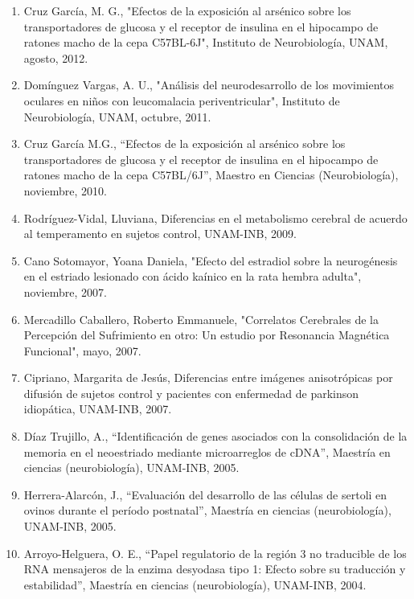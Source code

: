 \begin{enumerate}
\item Cruz García, M. G., "Efectos de la exposición al arsénico sobre los transportadores de glucosa y el receptor de insulina en el hipocampo de ratones 
macho de 
la cepa C57BL-6J", Instituto de Neurobiología, UNAM, agosto, 2012.

\item Domínguez Vargas, A. U., "Análisis del neurodesarrollo de los movimientos oculares en niños con leucomalacia periventricular", Instituto de 
Neurobiología, UNAM, octubre, 2011.

\item Cruz García M.G., “Efectos de la exposición al arsénico sobre los transportadores de glucosa y el receptor de insulina en el hipocampo de ratones 
macho de 
la cepa C57BL/6J”, Maestro en Ciencias (Neurobiología), noviembre, 2010.

\item Rodríguez-Vidal, Lluviana, Diferencias en el metabolismo cerebral de acuerdo al temperamento en sujetos control, UNAM-INB, 2009.

\item Cano Sotomayor, Yoana Daniela, "Efecto del estradiol sobre la neurogénesis en el estriado lesionado con ácido kaínico en la rata hembra adulta",   
noviembre, 2007.

\item Mercadillo Caballero, Roberto Emmanuele, "Correlatos Cerebrales de la Percepción del Sufrimiento en otro: Un estudio por Resonancia Magnética 
Funcional", mayo, 2007.

\item Cipriano, Margarita de Jesús, Diferencias entre imágenes anisotrópicas por difusión de sujetos control y pacientes con enfermedad de parkinson 
idiopática, UNAM-INB, 2007.

\item Díaz Trujillo, A., “Identificación de genes asociados con la consolidación de la memoria en el neoestriado mediante microarreglos de cDNA”, Maestría 
en 
ciencias (neurobiología), UNAM-INB, 2005.

\item Herrera-Alarcón, J., “Evaluación del desarrollo de las células de sertoli en ovinos durante el período postnatal”, Maestría en ciencias 
(neurobiología), 
UNAM-INB, 2005.

\item Arroyo-Helguera, O. E., “Papel regulatorio de la región 3 no traducible de los RNA mensajeros de la enzima desyodasa tipo 1: Efecto sobre su 
traducción y 
estabilidad”, Maestría en ciencias (neurobiología), UNAM-INB, 2004.


\end{enumerate}
